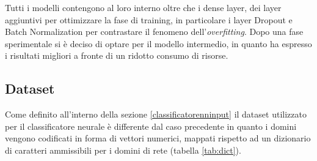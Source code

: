 Tutti i modelli contengono al loro interno oltre che i dense layer, dei layer aggiuntivi per ottimizzare la fase di training, in particolare i layer Dropout e Batch Normalization per contrastare il fenomeno dell'\textit{overfitting}. Dopo una fase sperimentale si è deciso di optare per il modello intermedio, in quanto ha espresso i risultati migliori a fronte di un ridotto consumo di risorse.

\subsection{Dataset}
Come definito all'interno della sezione \ref{classificatorenninput} il dataset utilizzato per il classificatore neurale è differente dal caso precedente in quanto i domini vengono codificati in forma di vettori numerici, mappati rispetto ad un dizionario di caratteri ammissibili per i domini di rete (tabella \ref{tab:dict}).

